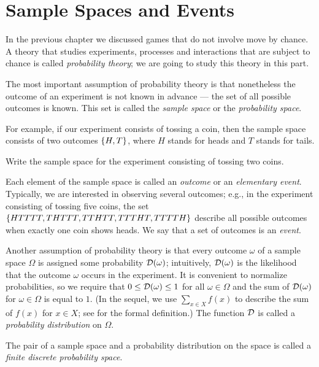 \chapter{Sample Spaces and Events}
In the previous chapter we discussed games that do not involve move by chance.
A theory that studies experiments, processes and interactions that are subject
to chance is called \emph{probability theory}; we are going to study this theory
in this part.

The most important assumption of probability theory is that nonetheless the
outcome of an experiment is not known in advance --- the set of all possible
outcomes is known. This set is called the \emph{sample space} or the
\emph{probability space}.

For example, if our experiment consists of tossing a coin, then the sample space
consists of two outcomes $\set{H, T}$, where $H$ stands for heads and $T$ stands
for tails.
\begin{exercise}
  Write the sample space for the experiment consisting of tossing two coins.
\end{exercise}
Each element of the sample space is called an \emph{outcome} or an
\emph{elementary event}. Typically, we are interested in observing several
outcomes; e.g., in the experiment consisting of tossing five coins, the set
$\set{HTTTT, THTTT, TTHTT, TTTHT, TTTTH}$ describe all possible outcomes when
exactly one coin shows heads. We say that a set of outcomes is an \emph{event}.

Another assumption of probability theory is that every outcome $\omega$ of a
sample space $\Omega$ is assigned some probability $\mathcal{D}(\omega)$;
intuitively, $\mathcal{D}(\omega)$ is the likelihood that the outcome
$\omega$ occurs in the experiment. It is convenient to normalize probabilities,
so we require that $0 \le \mathcal{D}(\omega) \le 1$ for all $\omega \in
\Omega$ and the sum of $\mathcal{D}(\omega)$ for $\omega \in \Omega$ is
equal to $1$. 
(In the sequel, we use $\sum_{x \in X} f(x)$ to describe the sum of $f(x)$ for
$x \in X$; see  for the formal definition.)
The function $\mathcal{D}$ is called a \emph{probability distribution} on
$\Omega$.

The pair of a sample space and a probability distribution on the space is called
a \emph{finite discrete probability space}.

